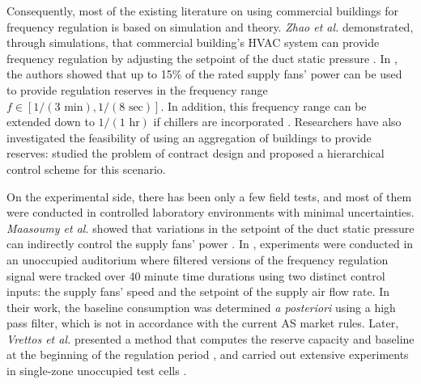 Consequently, most of the existing literature on using commercial buildings for frequency regulation is based on simulation and theory. 
\textit{Zhao et al.} demonstrated, through simulations, that commercial building's HVAC system can provide frequency regulation by adjusting the setpoint of the duct static pressure \cite{Zhao:2013hvac}.
In \cite{Hao:2014fan}, the authors showed that %
up to 15\% of the rated supply fans' power can be used to provide regulation reserves in the frequency range $f \in [1/(3 \text{~min}), 1/(8 \text{~sec})]$. 
In addition, this frequency range can be extended down to $1/(1 \text{~hr})$ if chillers are incorporated \cite{Lin:2013chiller}.
Researchers have also investigated the feasibility of using an aggregation of buildings to provide reserves: \cite{Balandat:2014contractdesign} studied the problem of contract design and \cite{Vrettos:2014aggregation} proposed a hierarchical control scheme for this scenario.

On the experimental side, there has been only a few field tests, and most of them were conducted in controlled laboratory environments with minimal uncertainties.
\textit{Maasoumy et al.} showed that variations in the setpoint of the duct static pressure can indirectly control the supply fans' power \cite{Maasoumy:2014exp}. %
In \cite{Lin:2015exp}, experiments were conducted in an unoccupied auditorium where filtered versions of the frequency regulation signal were tracked over 40 minute time durations using two distinct control inputs: the supply fans' speed and the setpoint of the supply air flow rate. 
In their work, the baseline consumption was determined \textit{a posteriori} using a high pass filter, which is not in accordance with the current AS market rules.
Later, \textit{Vrettos et al.} presented a method that computes the reserve capacity and baseline at the beginning of the regulation period \cite{Vrettos:2016flexlab1}, and carried out extensive experiments in single-zone unoccupied test cells \cite{Vrettos:2016flexlab2}.

